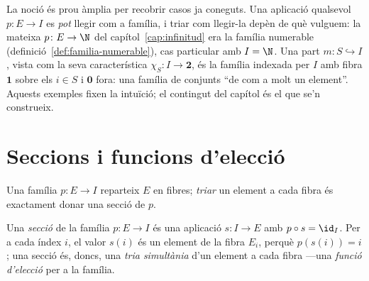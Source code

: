 \begin{observacio}\label{obs:familia-exemples}
La noció és prou àmplia per recobrir casos ja coneguts. Una aplicació
qualsevol \(p\colon E\to I\) es \emph{pot} llegir com a família, i triar com
llegir-la depèn de què vulguem: la mateixa \(p\colon E\to\N\) del
capítol~\ref{cap:infinitud} era la família numerable
(definició~\ref{def:familia-numerable}), cas particular amb \(I=\N\). Una
part \(m\colon S\hookrightarrow I\), vista com la seva característica
\(\chi_S\colon I\to\mathbf2\), és la família indexada per \(I\) amb fibra
\(\mathbf1\) sobre els \(i\in S\) i \(\mathbf0\) fora: una família de conjunts
\enquote{de com a molt un element}. Aquests exemples fixen la intuïció; el
contingut del capítol és el que se'n construeix.
\end{observacio}

\section{Seccions i funcions d'elecció}\label{sec:seccions}

Una família \(p\colon E\to I\) reparteix \(E\) en fibres; \emph{triar} un
element a cada fibra és exactament donar una secció de \(p\).

\begin{definicio}\label{def:seccio-familia}
Una \emph{secció} de la família \(p\colon E\to I\) és una aplicació
\(s\colon I\to E\) amb \(p\circ s=\id_I\). Per a cada índex \(i\), el valor
\(s(i)\) és un element de la fibra \(E_i\), perquè \(p(s(i))=i\); una secció
és, doncs, una \emph{tria simultània} d'un element a cada fibra ---una
\emph{funció d'elecció} per a la família.
\end{definicio}

